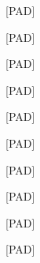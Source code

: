 \documentclass[varwidth=150mm]{standalone}
\begin{document}
\begin{CJK*}{UTF8}{gbsn}
{{{\colorbox{red!0.0}{\strut [PAD]} \colorbox{red!0.0}{\strut [PAD]} \colorbox{red!0.0}{\strut [PAD]} \colorbox{red!0.0}{\strut [PAD]} \colorbox{red!0.0}{\strut [PAD]} \colorbox{red!0.0}{\strut [PAD]} \colorbox{red!0.0}{\strut [PAD]} \colorbox{red!0.0}{\strut [PAD]} \colorbox{red!0.0}{\strut [PAD]} \colorbox{red!0.0}{\strut [PAD]}
}}}
\end{CJK*}
\end{document}
